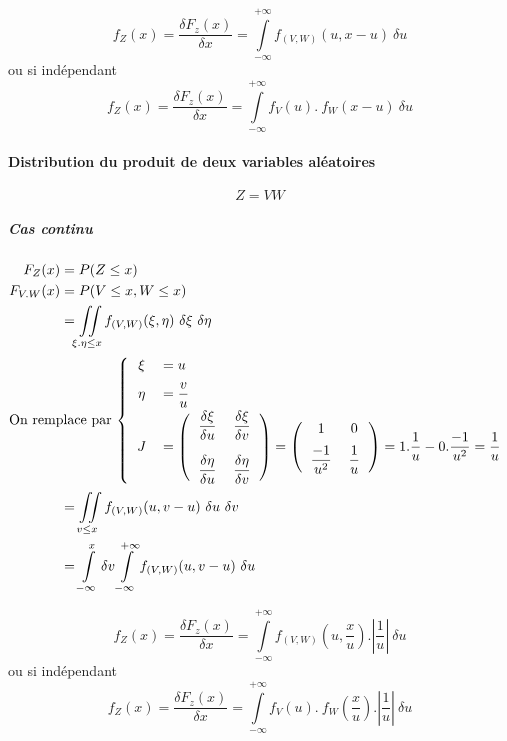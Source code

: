 $$\boxed{f_Z(x) = \frac{\delta F_z(x)}{\delta x} = \int\limits_{-\infty}^{+\infty} f_{(V,W)}(u,x-u)\ \delta u }$$
ou si indépendant
$$\boxed{f_Z(x) = \frac{\delta F_z(x)}{\delta x} = \int\limits_{-\infty}^{+\infty} f_V\left(u\right).\ f_W\left(x-u\right)\ \delta u }$$


\paragraph{Distribution du produit de deux variables aléatoires}
$$\boxed{Z = VW}$$

\subparagraph{Cas continu}
\begin{align*}
    F_Z(x)     &= P(Z \leq x)\\
    F_{V.W}(x) &= P(V \leq x, W \leq x) \\
	           &= \iint\limits_{\xi . \eta\leq x} f_{(V,W)}(\xi,\eta)\ \delta\xi\ \delta\eta\\
\intertext{On remplace par $\left\{
\begin{tabular}{cl}
	$\xi$  & $= u$\\[0.2cm]
	$\eta$ & $= \dfrac{v}{u}$\\[0.2cm]
	$J$    & $= \left(\begin{tabular}{cc}$\dfrac{\delta\xi}{\delta u}$&$\dfrac{\delta \xi}{\delta v}$\\[0.5cm]$\dfrac{\delta\eta}{\delta u}$&$\dfrac{\delta\eta}{\delta v}$\end{tabular}\right) = \left(\begin{tabular}{cc}1&0\\[0.2cm]$\dfrac{-1}{u^2}$&$\dfrac{1}{u}$\end{tabular}\right) = 1.\dfrac{1}{u} - 0.\dfrac{-1}{u^2} = \dfrac{1}{u}$
\end{tabular}
\right.$}
	           &= \iint\limits_{v\leq x} f_{(V,W)}(u,v-u)\ \delta u\ \delta v\\
               &= \int\limits_{-\infty}^x\delta v \int\limits_{-\infty}^{+\infty} f_{(V,W)}(u,v-u)\ \delta u
\end{align*}

$$\boxed{f_Z(x) = \frac{\delta F_z(x)}{\delta x} = \int\limits_{-\infty}^{+\infty} f_{(V,W)}\left(u,\dfrac{x}{u}\right).\left|\dfrac{1}{u}\right|\ \delta u }$$
ou si indépendant
$$\boxed{f_Z(x) = \frac{\delta F_z(x)}{\delta x} = \int\limits_{-\infty}^{+\infty} f_V\left(u\right).\ f_W\left(\dfrac{x}{u}\right).\left|\dfrac{1}{u}\right|\ \delta u }$$